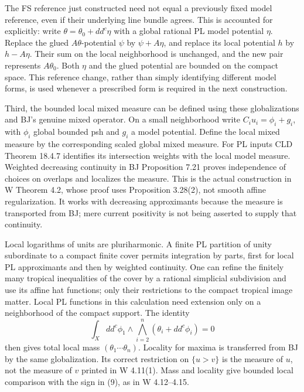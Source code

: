 \documentclass[
  11pt,
]{article}
\begin{document}
The FS reference just constructed need not equal a previously fixed
model reference, even if their underlying line bundle agrees. This is
accounted for explicitly: write \(\theta=\theta_0+dd^c\eta\) with a
global rational PL model potential \(\eta\). Replace the glued
\(A\theta\)-potential \(\psi\) by \(\psi+A\eta\), and replace its local
potential \(h\) by \(h-A\eta\). Their sum on the local neighborhood is
unchanged, and the new pair represents \(A\theta_0\). Both \(\eta\) and
the glued potential are bounded on the compact space. This reference
change, rather than simply identifying different model forms, is used
whenever a prescribed form is required in the next construction.

Third, the bounded local mixed measure can be defined using these
globalizations and BJ's genuine mixed operator. On a small neighborhood
write \(C_i u_i=\phi_i+g_i\), with \(\phi_i\) global bounded psh and
\(g_i\) a model potential. Define the local mixed measure by the
corresponding scaled global mixed measure. For PL inputs CLD Theorem
18.4.7 identifies its intersection weights with the local model measure.
Weighted decreasing continuity in BJ Proposition 7.21 proves
independence of choices on overlaps and localizes the measure. This is
the actual construction in W Theorem 4.2, whose proof uses Proposition
3.28(2), not smooth affine regularization. It works with decreasing
approximants because the measure is transported from BJ; mere current
positivity is not being asserted to supply that continuity.

Local logarithms of units are pluriharmonic. A finite PL partition of
unity subordinate to a compact finite cover permits integration by
parts, first for local PL approximants and then by weighted continuity.
One can refine the finitely many tropical inequalities of the cover by a
rational simplicial subdivision and use its affine hat functions; only
their restrictions to the compact tropical image matter. Local PL
functions in this calculation need extension only on a neighborhood of
the compact support. The identity
\[\int_X dd^c\phi_1\wedge\bigwedge_{i=2}^n(\theta_i+dd^c\phi_i)=0\] then
gives total local mass \((\theta_1\cdots\theta_n)\). Locality for maxima
is transferred from BJ by the same globalization. Its correct
restriction on \(\{u>v\}\) is the measure of \(u\), not the measure of
\(v\) printed in W 4.11(1). Mass and locality give bounded local
comparison with the sign in (9), as in W 4.12--4.15.
\end{document}
